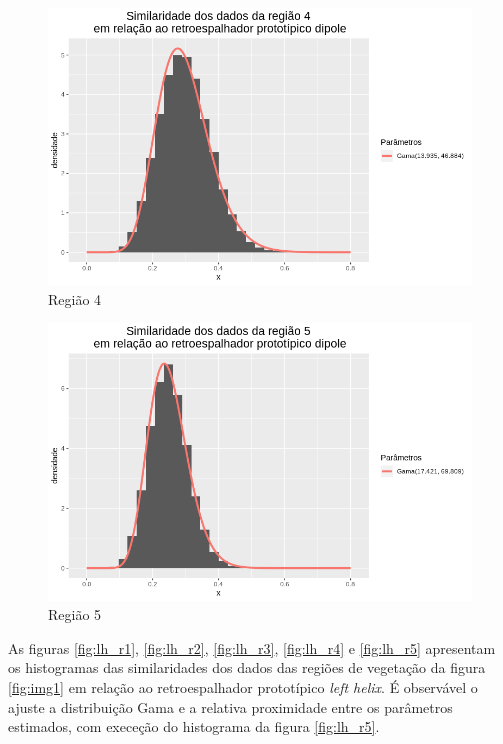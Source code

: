\documentclass[12pt]{article}
\begin{document}
\begin{figure}[!h]
    \centering
    \vspace{0.1\linewidth}
    \includegraphics[width = \linewidth]{../../Images/Report_18_12_20/dip_region4.png}
    \caption{Região 4}
    \label{fig:dip_r4}
\end{figure}

\begin{figure}[!h]
    \centering
    \includegraphics[width = \linewidth]{../../Images/Report_18_12_20/dip_region5.png}
    \caption{Região 5}
    \label{fig:dip_r5}
\end{figure}

As figuras \ref{fig:lh_r1}, \ref{fig:lh_r2}, \ref{fig:lh_r3}, \ref{fig:lh_r4} e \ref{fig:lh_r5} apresentam os histogramas das similaridades dos dados das regiões de vegetação da figura \ref{fig:img1} em relação ao retroespalhador prototípico \textit{left helix}. É observável o ajuste a distribuição Gama e a relativa proximidade entre os parâmetros estimados, com execeção do histograma da figura \ref{fig:lh_r5}.
\end{document}

